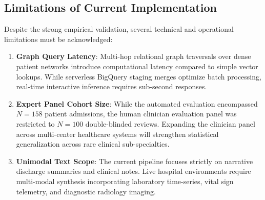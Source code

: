 \documentclass[11pt, a4paper]{article}
\begin{document}
\subsection{Limitations of Current Implementation}
Despite the strong empirical validation, several technical and operational limitations must be acknowledged:
\begin{enumerate}
  \item \textbf{Graph Query Latency}: Multi-hop relational graph traversals over dense patient networks introduce computational latency compared to simple vector lookups. While serverless BigQuery staging merges optimize batch processing, real-time interactive inference requires sub-second responses.
  \item \textbf{Expert Panel Cohort Size}: While the automated evaluation encompassed $N = 158$ patient admissions, the human clinician evaluation panel was restricted to $N = 100$ double-blinded reviews. Expanding the clinician panel across multi-center healthcare systems will strengthen statistical generalization across rare clinical sub-specialties.
  \item \textbf{Unimodal Text Scope}: The current pipeline focuses strictly on narrative discharge summaries and clinical notes. Live hospital environments require multi-modal synthesis incorporating laboratory time-series, vital sign telemetry, and diagnostic radiology imaging.
\end{enumerate}
\end{document}
